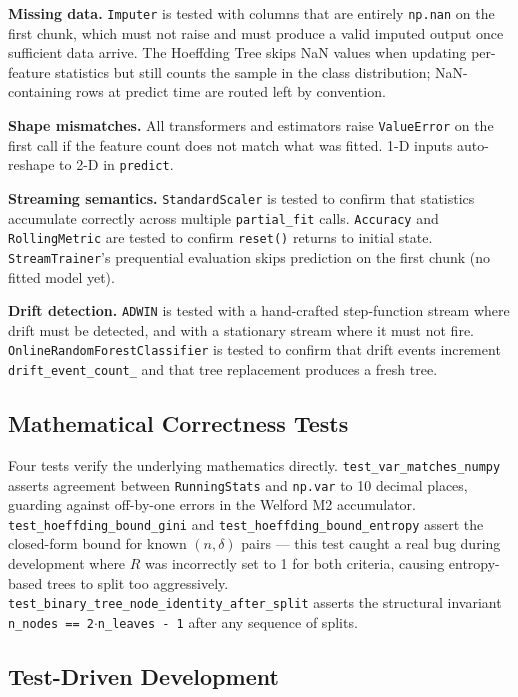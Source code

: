 \documentclass[10pt,a4paper]{article}
\begin{document}
\textbf{Missing data.} \texttt{Imputer} is tested with columns that are entirely \texttt{np.nan} on the first chunk, which must not raise and must produce a valid imputed output once sufficient data arrive. The Hoeffding Tree skips NaN values when updating per-feature statistics but still counts the sample in the class distribution; NaN-containing rows at predict time are routed left by convention.

\textbf{Shape mismatches.} All transformers and estimators raise \texttt{ValueError} on the first call if the feature count does not match what was fitted. 1-D inputs auto-reshape to 2-D in \texttt{predict}.

\textbf{Streaming semantics.} \texttt{StandardScaler} is tested to confirm that statistics accumulate correctly across multiple \texttt{partial\_fit} calls. \texttt{Accuracy} and \texttt{RollingMetric} are tested to confirm \texttt{reset()} returns to initial state. \texttt{StreamTrainer}'s prequential evaluation skips prediction on the first chunk (no fitted model yet).

\textbf{Drift detection.} \texttt{ADWIN} is tested with a hand-crafted step-function stream where drift must be detected, and with a stationary stream where it must not fire. \texttt{OnlineRandomForestClassifier} is tested to confirm that drift events increment \texttt{drift\_event\_count\_} and that tree replacement produces a fresh tree.

\subsection{Mathematical Correctness Tests}

Four tests verify the underlying mathematics directly. \texttt{test\_var\_matches\_numpy} asserts agreement between \texttt{RunningStats} and \texttt{np.var} to 10 decimal places, guarding against off-by-one errors in the Welford M2 accumulator. \texttt{test\_hoeffding\_bound\_gini} and \texttt{test\_hoeffding\_bound\_entropy} assert the closed-form bound for known $(n, \delta)$ pairs --- this test caught a real bug during development where $R$ was incorrectly set to 1 for both criteria, causing entropy-based trees to split too aggressively. \texttt{test\_binary\_tree\_node\_identity\_after\_split} asserts the structural invariant \texttt{n\_nodes == 2$\cdot$n\_leaves - 1} after any sequence of splits.

\subsection{Test-Driven Development}
\end{document}

